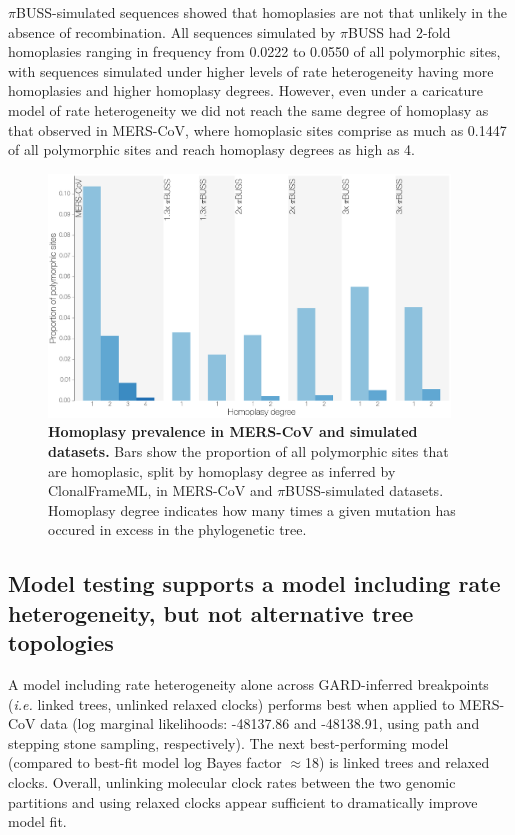 \documentclass[11pt,oneside,letterpaper]{article}
\begin{document}
$\pi$BUSS-simulated sequences showed that homoplasies are not that unlikely in the absence of recombination.
All sequences simulated by $\pi$BUSS had 2-fold homoplasies ranging in frequency from 0.0222 to 0.0550 of all polymorphic sites, with sequences simulated under higher levels of rate heterogeneity having more homoplasies and higher homoplasy degrees.
However, even under a caricature model of rate heterogeneity we did not reach the same degree of homoplasy as that observed in MERS-CoV, where homoplasic sites comprise as much as 0.1447 of all polymorphic sites and reach homoplasy degrees as high as 4.

\begin{figure}[h!]
	\centering
	\includegraphics[width=0.95\textwidth]{figures/MERS_homoplasy_control.png}
	\caption{\textbf{Homoplasy prevalence in MERS-CoV and simulated datasets.}
Bars show the proportion of all polymorphic sites that are homoplasic, split by homoplasy degree as inferred by ClonalFrameML, in MERS-CoV and $\pi$BUSS-simulated datasets.
Homoplasy degree indicates how many times a given mutation has occured in excess in the phylogenetic tree.}
	\label{homoplasy_control}
\end{figure}

\subsection*{Model testing supports a model including rate heterogeneity, but not alternative tree topologies}
A model including rate heterogeneity alone across GARD-inferred breakpoints (\textit{i.e.} linked trees, unlinked relaxed clocks) performs best when applied to MERS-CoV data (log marginal likelihoods: -48137.86 and -48138.91, using path and stepping stone sampling, respectively).
The next best-performing model (compared to best-fit model log Bayes factor $\approx$18) is linked trees and relaxed clocks.
Overall, unlinking molecular clock rates between the two genomic partitions and using relaxed clocks appear sufficient to dramatically improve model fit.
\end{document}
